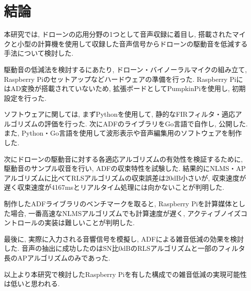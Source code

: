 \chapter{結論}\label{conclusion}

本研究では, ドローンの応用分野の1つとして音声収録に着目し, 搭載されたマイクと小型の計算機を使用して収録した音声信号からドローンの駆動音を低減する手法について検討した. 

駆動音の低減法を検討するにあたり, ドローン・バイノーラルマイクの組み立て, Raspberry Piのセットアップなどハードウェアの準備を行った.  Raspberry PiにはAD変換が搭載されていないため, 拡張ボードとしてPumpkinPiを使用し, 初期設定を行った. 

ソフトウェアに関しては, まずPythonを使用して, 静的なFIRフィルタ・適応アルゴリズムの評価を行った. 次にADFのライブラリをGo言語で自作し, 公開した. また, Python・Go言語を使用して波形表示や音声編集用のソフトウェアを制作した. 

次にドローンの駆動音に対する各適応アルゴリズムの有効性を検証するために, 駆動音のサンプル収音を行い, ADFの収束特性を試験した. 結果的にNLMS・APアルゴリズムに比べてRLSアルゴリズムの収束誤差は20dB小さいが, 収束速度が遅く収束速度が4167msとリアルタイム処理には向かないことが判明した. 

制作したADFライブラリのベンチマークを取ると, Raspberry Piを計算媒体とした場合, 一番高速なNLMSアルゴリズムでも計算速度が遅く, アクティブノイズコントロールの実装は難しいことが判明した. 

最後に, 実際に入力される音響信号を模擬し, ADFによる雑音低減の効果を検討した. 音声の抽出に成功したのはSN比0dBのRLSアルゴリズムと一部のフィルタ長のAPアルゴリズムのみであった. 

以上より本研究で検討したRaspberry Piを有した構成での雑音低減の実現可能性は低いと思われる. 
